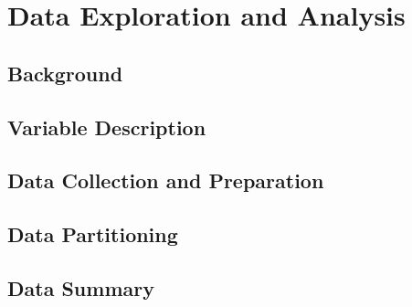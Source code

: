 
\chapter{Data Exploration and Analysis} %

\label{Chapter3} %



\section{Background}




\section{Variable Description}



\section{Data Collection and Preparation}



\section{Data Partitioning}



\section{Data Summary}

